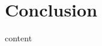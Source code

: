 \documentclass[electronic]{vgtc}             %
\begin{document}


\section{Conclusion}
content

%
%
%

%


\end{document}
